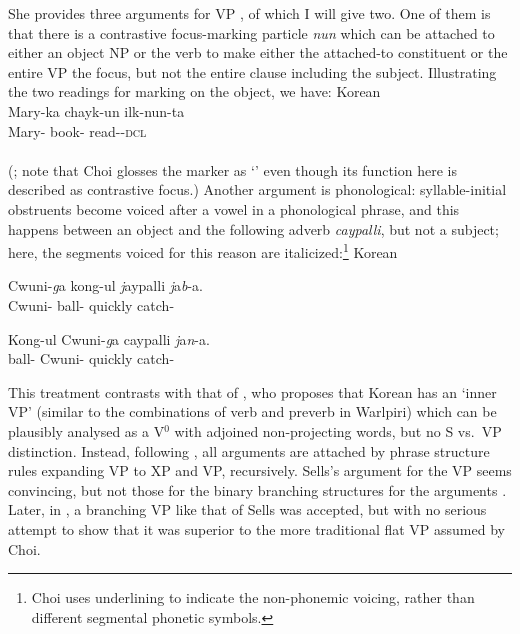 \documentclass[output=paper,hidelinks]{langscibook}
\begin{document}
She provides three arguments for VP \citep[43--47]{Choi1999}, of which I will give two. One
of them is that there is a
contrastive focus-marking particle {\it nun} which can be attached to either an
object NP or the verb to make either the attached-to constituent or the entire VP
the focus, but not the entire clause including the subject.  Illustrating the
two readings for marking on the object, we have:
\ea Korean\\
\gll Mary-ka chayk-un ilk-nun-ta\\
Mary-{\NOM} book-{\TOP} read-\PRS-\textsc{dcl}\\
\\
     (\citealt[45, example 52]{Choi1999}; note that Choi glosses the marker as `\TOP' even though
its function here is described as contrastive focus.)
\z
Another argument is phonological: syllable-initial obstruents become voiced after a vowel
in a phonological phrase, and this happens between an object and the
following adverb {\it caypalli}, but not a subject; here, the segments
voiced for this reason are italicized:\footnote
  {Choi uses underlining to indicate the non-phonemic voicing, rather than
  different segmental phonetic symbols.}
\ea \label{korscram} Korean
\begin{xlist}
\item
\gll  Cwuni-{\it g}a kong-ul {\it j}aypalli {\it j}a{\it b}-a.\\
Cwuni-{\NOM} ball-{\ACC} quickly catch-\PRS\\
\item
\gll Kong-ul Cwuni-{\it g}a caypalli {\it j}a{\it n}-a.\\
ball-{\ACC} Cwuni-{\NOM} quickly catch-\PRS\\
\end{xlist}
\z
This treatment contrasts with that of \citet{sells1994}, who proposes that Korean
has an `inner VP' (similar to the combinations of verb and preverb in Warlpiri)
which can be plausibly analysed as a V$^0$ with adjoined non-projecting words,
but no S vs.\ VP distinction.
Instead, following \citet{fukui1986}, all arguments are attached by phrase structure rules
expanding VP to XP and VP, recursively. Sells's argument for the VP seems convincing,
but not those for the binary branching structures for the arguments \citep[353, fn.\ 2]{sells1994}.
Later, in \citet{bresnan2001lexical}, a branching VP like that of Sells was
accepted, but with no serious attempt to show that it was superior to the
more traditional flat VP assumed by Choi.
\end{document}
